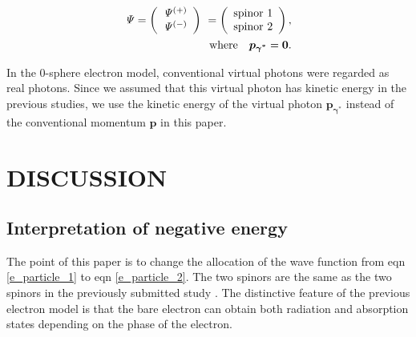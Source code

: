 \documentclass[%
 reprint,
 amsmath,amssymb,
 aps,
]{revtex4-1}
\numberwithin{equation}{section}%
\begin{document}
        \begin{align}
            \it\Psi =
                \left( 
                    \begin{array}{c}
                        \it\Psi^{(+)} \\ \it\Psi^{(-)}
                    \end{array}
                \right) \
            =
                \left(
                    \begin{array}{c}
                        \mathrm{spinor \ 1} \\ \mathrm{spinor \ 2}
                    \end{array}
                \right)
                ,
            \notag
            \\
            \mathrm{where} \ \ \ \bm{p_{\gamma^{*}}} = \bm{0}
            .
        \label{e_particle_2_1}
        \end{align}    


    In the 0-sphere electron model, conventional virtual photons were regarded as real photons. Since we assumed that this virtual photon has kinetic energy in the previous studies, we use the kinetic energy of the virtual photon $ \bm{p_{\gamma^{*}}} $ instead of the conventional momentum $\bm{p}$ in this paper.


\section{\label{sec:XXXX}DISCUSSION}


\subsection{
    \label{sec:Interpretation of negative energy}
        Interpretation of negative energy}


    The point of this paper is to change the allocation of the wave function from eqn \ref{e_particle_1} to eqn \ref{e_particle_2}. The two spinors are the same as the two spinors in the previously submitted study \cite{Hanamura1}. The distinctive feature of the previous electron model is that the bare electron can obtain both radiation and absorption states depending on the phase of the electron.
\end{document}
